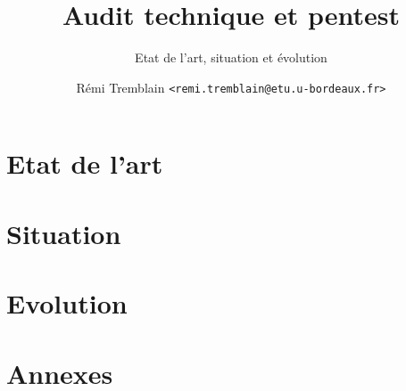 \documentclass[a4paper]{memoir}
\title{Audit technique et pentest}
\subtitle{Etat de l'art, situation et évolution}
\author{Rémi Tremblain \texttt{<remi.tremblain@etu.u-bordeaux.fr>}}
\begin{document}
\frontmatter%
\maketitle
\thispagestyle{empty}







\cleardoublepage
\tableofcontents*



\mainmatter%
\part{Etat de l'art}




\part{Situation}




\part{Evolution}








\part*{Annexes}
\appendix





\backmatter%

\nocite{*}



\printindex
\end{document}
